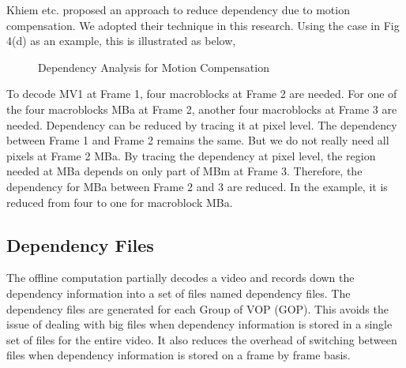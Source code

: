 Khiem etc. proposed an approach to reduce dependency due to motion compensation\cite{Ngo:2011:AEZ:1943552.1943581}. We adopted their technique in this research. Using the case in Fig 4(d) as an example, this is illustrated as below,
\begin{figure}
\centering
\quad\quad
{}
\caption{Dependency Analysis for Motion Compensation}
\end{figure}
To decode MV1 at Frame 1, four macroblocks at Frame 2 are needed. For one of the four macroblocks MBa at Frame 2, another four macroblocks at Frame 3 are needed. Dependency can be reduced by tracing it at pixel level. The dependency between Frame 1 and Frame 2 remains the same. But we do not really need all pixels at Frame 2 MBa. By tracing the dependency at pixel level, the region needed at MBa depends on only part of MBm at Frame 3. Therefore, the dependency for MBa between Frame 2 and 3 are reduced. In the example, it is reduced from four to one for macroblock MBa. 

\subsection{Dependency Files}
The offline computation partially decodes a video and records down the dependency information into a set of files named dependency files. The dependency files are generated for each Group of VOP (GOP). This avoids the issue of dealing with big files when dependency information is stored in a single set of files for the entire video. It also reduces the overhead of switching between files when dependency information is stored on a frame by frame basis. 

